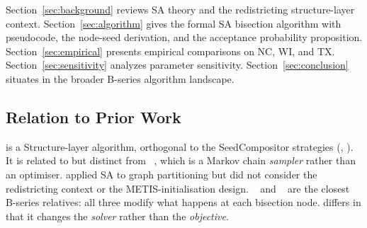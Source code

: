 Section~\ref{sec:background} reviews SA theory and the redistricting
structure-layer context.
Section~\ref{sec:algorithm} gives the formal SA bisection algorithm with
pseudocode, the node-seed derivation, and the acceptance probability
proposition.
Section~\ref{sec:empirical} presents empirical comparisons on NC, WI, and TX.
Section~\ref{sec:sensitivity} analyzes parameter sensitivity.
Section~\ref{sec:conclusion} situates \sa{} in the broader B-series
algorithm landscape.

\subsection{Relation to Prior Work}

\sa{} is a Structure-layer algorithm, orthogonal to the SeedCompositor
strategies (\cs{}, \be{}).
It is related to but distinct from \recom{}~\citep{deford2021}, which is
a Markov chain \emph{sampler} rather than an optimiser.
\citet{battiti1999} applied SA to graph partitioning but did not consider
the redistricting context or the METIS-initialisation design.
\geosec{}~\citep{b8paper} and \areasec{}~\citep{b9paper} are the closest
B-series relatives: all three modify what happens at each bisection node.
\sa{} differs in that it changes the \emph{solver} rather than the
\emph{objective}.
